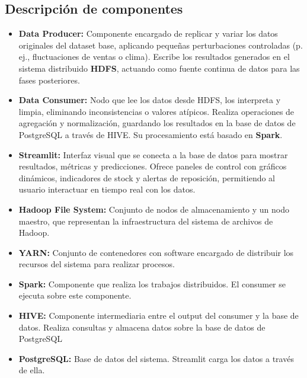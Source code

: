 \documentclass[12pt,a4paper]{article}
\begin{document}
	\subsection*{Descripción de componentes}
	\begin{itemize}
		\item \textbf{Data Producer:} Componente encargado de replicar y variar los datos originales del dataset base, aplicando pequeñas perturbaciones controladas (p. ej., fluctuaciones de ventas o clima). Escribe los resultados generados en el sistema distribuido \textbf{HDFS}, actuando como fuente continua de datos para las fases posteriores.
		
		\item \textbf{Data Consumer:} Nodo que lee los datos desde HDFS, los interpreta y limpia, eliminando inconsistencias o valores atípicos. Realiza operaciones de agregación y normalización, guardando los resultados en la base de datos de PostgreSQL a través de HIVE. Su procesamiento está basado en \textbf{Spark}.
		
		\item \textbf{Streamlit:} Interfaz visual que se conecta a la base de datos para mostrar resultados, métricas y predicciones. Ofrece paneles de control con gráficos dinámicos, indicadores de stock y alertas de reposición, permitiendo al usuario interactuar en tiempo real con los datos.
		
		\item \textbf{Hadoop File System:} Conjunto de nodos de almacenamiento y un nodo maestro, que representan la infraestructura del sistema de archivos de Hadoop.
		
		\item \textbf{YARN:} Conjunto de contenedores con software encargado de distribuir los recursos del sistema para realizar procesos.
		
		\item \textbf{Spark:} Componente que realiza los trabajos distribuidos. El consumer se ejecuta sobre este componente.
		
		\item \textbf{HIVE:} Componente intermediaria entre el output del consumer y la base de datos. Realiza consultas y almacena datos sobre la base de datos de PostgreSQL
		
		\item \textbf{PostgreSQL:} Base de datos del sistema. Streamlit carga los datos a través de ella.
		
		
	\end{itemize}
	
\end{document}
